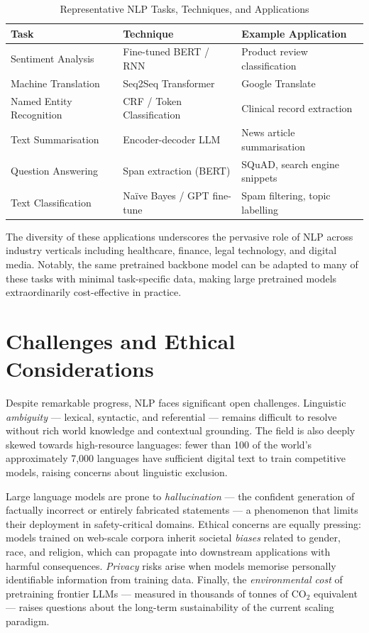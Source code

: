 \documentclass[12pt, a4paper]{article}
\begin{document}
\begin{table}[h]
\centering
\caption{Representative NLP Tasks, Techniques, and Applications}
\label{tab:tasks}
\renewcommand{\arraystretch}{1.3}
\begin{tabular}{@{}lll@{}}
\toprule
\textbf{Task} & \textbf{Technique} & \textbf{Example Application} \\
\midrule
Sentiment Analysis     & Fine-tuned BERT / RNN       & Product review classification \\
Machine Translation    & Seq2Seq Transformer         & Google Translate              \\
Named Entity Recognition & CRF / Token Classification & Clinical record extraction   \\
Text Summarisation     & Encoder-decoder LLM         & News article summarisation    \\
Question Answering     & Span extraction (BERT)      & SQuAD, search engine snippets \\
Text Classification    & Naïve Bayes / GPT fine-tune & Spam filtering, topic labelling \\
\bottomrule
\end{tabular}
\end{table}

The diversity of these applications underscores the pervasive role of NLP
across industry verticals including healthcare, finance, legal technology, and
digital media. Notably, the same pretrained backbone model can be adapted to
many of these tasks with minimal task-specific data, making large pretrained
models extraordinarily cost-effective in practice.


\section{Challenges and Ethical Considerations}

Despite remarkable progress, NLP faces significant open challenges. Linguistic
\textit{ambiguity} --- lexical, syntactic, and referential --- remains difficult
to resolve without rich world knowledge and contextual grounding. The field is
also deeply skewed towards high-resource languages: fewer than 100 of the world's
approximately 7,000 languages have sufficient digital text to train competitive
models, raising concerns about linguistic exclusion.

Large language models are prone to \textit{hallucination} --- the confident
generation of factually incorrect or entirely fabricated statements --- a
phenomenon that limits their deployment in safety-critical domains. Ethical
concerns are equally pressing: models trained on web-scale corpora inherit
societal \textit{biases} related to gender, race, and religion, which can
propagate into downstream applications with harmful consequences. \textit{Privacy}
risks arise when models memorise personally identifiable information from training
data. Finally, the \textit{environmental cost} of pretraining frontier LLMs ---
measured in thousands of tonnes of CO$_2$ equivalent --- raises questions about
the long-term sustainability of the current scaling paradigm.
\end{document}

